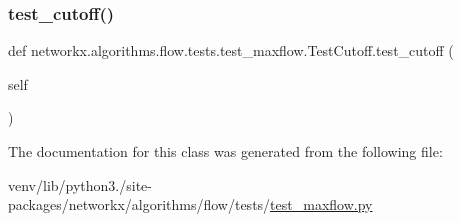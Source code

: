 \mbox{\label{classnetworkx_1_1algorithms_1_1flow_1_1tests_1_1test__maxflow_1_1TestCutoff_aa538d19f5bd07738bc67df10e9c5e095}} 
\subsubsection{\texorpdfstring{test\+\_\+cutoff()}{test\_cutoff()}}
{\footnotesize\ttfamily def networkx.\+algorithms.\+flow.\+tests.\+test\+\_\+maxflow.\+Test\+Cutoff.\+test\+\_\+cutoff (\begin{DoxyParamCaption}\item[{}]{self }\end{DoxyParamCaption})}



The documentation for this class was generated from the following file\+:\begin{DoxyCompactItemize}
\item 
venv/lib/python3./site-\/packages/networkx/algorithms/flow/tests/\hyperlink{test__maxflow_8py}{test\+\_\+maxflow.\+py}\end{DoxyCompactItemize}
